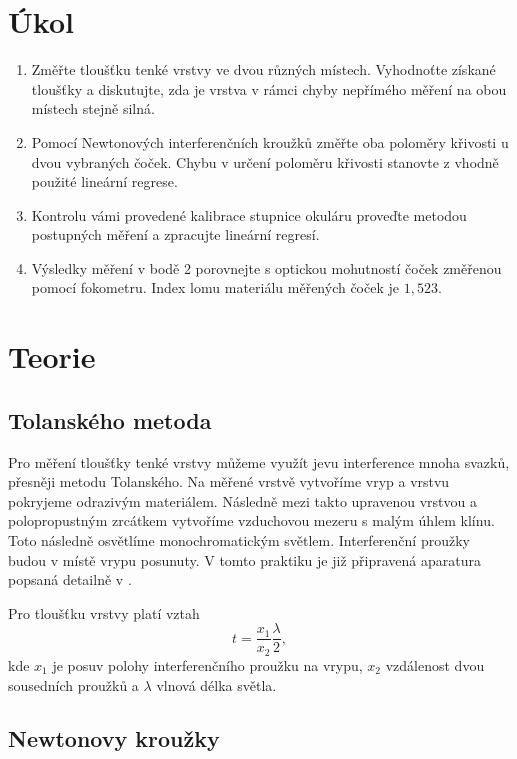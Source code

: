\documentclass{protokol}
\begin{document}
  \section*{Úkol}

    \begin{enumerate}
      \item Změřte tloušťku tenké vrstvy ve dvou různých místech. Vyhodnoťte získané tloušťky a diskutujte, zda je vrstva v rámci chyby nepřímého měření na obou místech stejně silná.
      \item Pomocí Newtonových interferenčních kroužků změřte oba poloměry křivosti u dvou vybraných čoček. Chybu v určení poloměru křivosti stanovte z vhodně použité lineární regrese.
      \item Kontrolu vámi provedené kalibrace stupnice okuláru proveďte metodou postupných měření a zpracujte lineární regresí.
      \item Výsledky měření v bodě 2 porovnejte s optickou mohutností čoček změřenou pomocí fokometru. Index lomu materiálu měřených čoček je \(1,523\).
    \end{enumerate}

  \section*{Teorie}

    \subsection*{Tolanského metoda}

      Pro měření tloušťky tenké vrstvy můžeme využít jevu interference mnoha svazků, přesněji metodu Tolanského. Na měřené vrstvě vytvoříme vryp a vrstvu pokryjeme odrazivým materiálem. Následně mezi takto upravenou vrstvou a polopropustným zrcátkem vytvoříme vzduchovou mezeru s malým úhlem klínu. Toto následně osvětlíme monochromatickým světlem. Interferenční proužky budou v místě vrypu posunuty. V tomto praktiku je již připravená aparatura popsaná detailně v \cite{mereni}. 
      
      Pro tloušťku vrstvy platí vztah
      \begin{equation} \label{eq:vrstva}
        t = \frac{x_1}{x_2} \frac{\lambda}{2},
      \end{equation} 
      kde $x_1$ je posuv polohy interferenčního proužku na vrypu, $x_2$ vzdálenost dvou sousedních proužků a $\lambda$ vlnová délka světla.

    \subsection*{Newtonovy kroužky}
\end{document}
